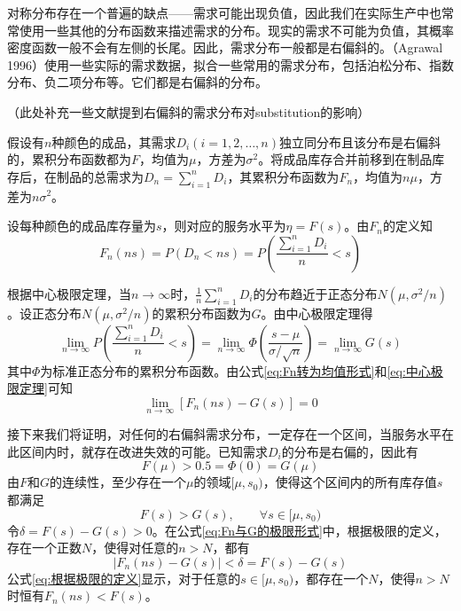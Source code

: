 对称分布存在一个普遍的缺点——需求可能出现负值，因此我们在实际生产中也常常使用一些其他的分布函数来描述需求的分布。现实的需求不可能为负值，其概率密度函数一般不会有左侧的长尾。因此，需求分布一般都是右偏斜的。（Agrawal 1996）使用一些实际的需求数据，拟合一些常用的需求分布，包括泊松分布、指数分布、负二项分布等。它们都是右偏斜的分布。

（此处补充一些文献提到右偏斜的需求分布对substitution的影响）

假设有$n$种颜色的成品，其需求$D_i(i=1,2,\ldots,n)$独立同分布且该分布是右偏斜的，累积分布函数都为$F$，均值为$\mu$，方差为$\sigma^2$。将成品库存合并前移到在制品库存后，在制品的总需求为$D_n=\sum_{i=1}^nD_i$，其累积分布函数为$F_n$，均值为$n\mu$，方差为$n\sigma^2$。

设每种颜色的成品库存量为$s$，则对应的服务水平为$\eta=F(s)$。由$F_n$的定义知
\begin{equation}
F_n(ns) = P(D_n<ns) = P\left(\frac{\sum_{i=1}^nD_i}{n}<s\right)
\label{eq:Fn转为均值形式}
\end{equation}

根据中心极限定理，当$n\to\infty$时，$\frac{1}{n}\sum_{i=1}^nD_i$的分布趋近于正态分布$N(\mu,\sigma^2/n)$。设正态分布$N(\mu,\sigma^2/n)$的累积分布函数为$G$。由中心极限定理得
\begin{equation}
\lim_{n\to\infty}P\left(\frac{\sum_{i=1}^nD_i}{n}<s\right) = \lim_{n\to\infty}\Phi\left(\frac{s-\mu}{\sigma/\sqrt{n}}\right) = \lim_{n\to\infty}G(s)
\label{eq:中心极限定理}
\end{equation}
其中$\Phi$为标准正态分布的累积分布函数。由公式\ref{eq:Fn转为均值形式}和\ref{eq:中心极限定理}可知
\begin{equation}
\lim_{n\to\infty}[F_n(ns)-G(s)]=0
\label{eq:Fn与G的极限形式}
\end{equation}

接下来我们将证明，对任何的右偏斜需求分布，一定存在一个区间，当服务水平在此区间内时，就存在改进失效的可能。已知需求$D_i$的分布是右偏的，因此有
\begin{equation}
F(\mu) > 0.5 = \Phi(0) = G(\mu)
\label{eq:右偏斜的性质}
\end{equation}
由$F$和$G$的连续性，至少存在一个$\mu$的领域$[\mu,s_0)$，使得这个区间内的所有库存值$s$都满足
\[
F(s) > G(s),\qquad \forall s\in[\mu,s_0)
\]
令$\delta=F(s)-G(s)>0$。在公式\ref{eq:Fn与G的极限形式}中，根据极限的定义，存在一个正数$N$，使得对任意的$n>N$，都有
\begin{equation}
|F_n(ns)-G(s)| < \delta = F(s) - G(s)
\label{eq:根据极限的定义}
\end{equation}
公式\ref{eq:根据极限的定义}显示，对于任意的$s\in[\mu,s_0)$，都存在一个$N$，使得$n>N$时恒有$F_n(ns)<F(s)$。

